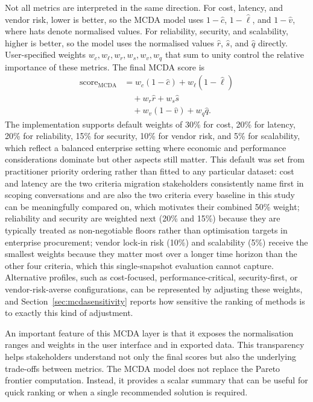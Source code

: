 \documentclass[journal]{IEEEtran}
\begin{document}
Not all metrics are interpreted in the same direction. For cost, latency, and
vendor risk, lower is better, so the MCDA model uses $1 - \hat{c}$,
$1 - \hat{\ell}$, and $1 - \hat{v}$, where hats denote normalised values. For
reliability, security, and scalability, higher is better, so the model uses the
normalised values $\hat{r}$, $\hat{s}$, and $\hat{q}$ directly.
User-specified weights $w_c, w_\ell, w_r, w_s, w_v, w_q$ that sum to unity
control the relative importance of these metrics. The final MCDA score is
\begin{align}
  \mathrm{score}_{\mathrm{MCDA}} &= w_c(1 - \hat{c}) + w_\ell(1 - \hat{\ell})
    \nonumber \\
  &\quad + w_r\hat{r} + w_s\hat{s} \label{eq:mcda} \\
  &\quad + w_v(1 - \hat{v}) + w_q\hat{q}. \nonumber
\end{align}
The implementation supports default weights of 30\% for cost, 20\% for
latency, 20\% for reliability, 15\% for security, 10\% for vendor risk, and
5\% for scalability, which reflect a balanced enterprise setting where economic
and performance considerations dominate but other aspects still matter. This
default was set from practitioner priority ordering rather than fitted to any
particular dataset: cost and latency are the two criteria migration
stakeholders consistently name first in scoping conversations and are also the
two criteria every baseline in this study can be meaningfully compared on,
which motivates their combined 50\% weight; reliability and security are
weighted next (20\% and 15\%) because they are typically treated as
non-negotiable floors rather than optimisation targets in enterprise
procurement; vendor lock-in risk (10\%) and scalability (5\%) receive the
smallest weights because they matter most over a longer time horizon than the
other four criteria, which this single-snapshot evaluation cannot capture.
Alternative profiles, such as cost-focused, performance-critical,
security-first, or vendor-risk-averse configurations, can be represented by
adjusting these weights, and Section~\ref{sec:mcdasensitivity} reports how
sensitive the ranking of methods is to exactly this kind of adjustment.

An important feature of this MCDA layer is that it exposes the normalisation
ranges and weights in the user interface and in exported data. This transparency
helps stakeholders understand not only the final scores but also the underlying
trade-offs between metrics. The MCDA model does not replace the Pareto frontier
computation. Instead, it provides a scalar summary that can be useful for quick
ranking or when a single recommended solution is required.
\end{document}
